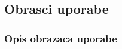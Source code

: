 			\eject 
			
			
				
			\subsection{Obrasci uporabe}
				
				
				\subsubsection{Opis obrazaca uporabe}
					

					
				
